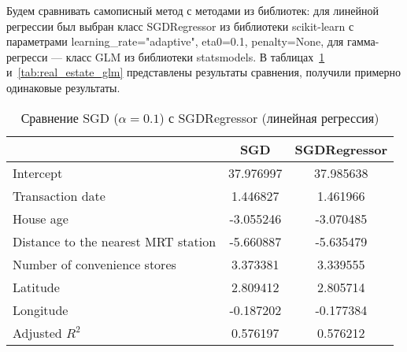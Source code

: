 \documentclass[a4paper]{article}
\begin{document}
Будем сравнивать самописный метод с методами из библиотек: для линейной регрессии был выбран класс \textsf{SGDRegressor} из библиотеки \textsf{scikit-learn} с параметрами \textsf{learning\_rate="adaptive"}, \textsf{eta0=0.1}, \textsf{penalty=None}, для гамма-регресси --- класс \textsf{GLM} из библиотеки \textsf{statsmodels}. В таблицах~\ref{tab:real_estate_lm} и~\ref{tab:real_estate_glm} представлены результаты сравнения, получили примерно одинаковые результаты.
\begin{table}[h]
    \caption{Сравнение \textsf{SGD} ($\alpha=0.1$) с \textsf{SGDRegressor} (линейная регрессия)}
    \centering
    \begin{tabular}{|l|c|c|}
        \hline
                                            & \textsf{SGD} & \textsf{SGDRegressor} \\
        \hline
        Intercept                           & 37.976997    & 37.985638             \\
        Transaction date                    & 1.446827     & 1.461966              \\
        House age                           & -3.055246    & -3.070485             \\
        Distance to the nearest MRT station & -5.660887    & -5.635479             \\
        Number of convenience stores        & 3.373381     & 3.339555              \\
        Latitude                            & 2.809412     & 2.805714              \\
        Longitude                           & -0.187202    & -0.177384             \\
        \hhline{===}
        Adjusted $R^2$                      & 0.576197     & 0.576212              \\
        \hline
    \end{tabular}
    \label{tab:real_estate_lm}
\end{table}
\end{document}
